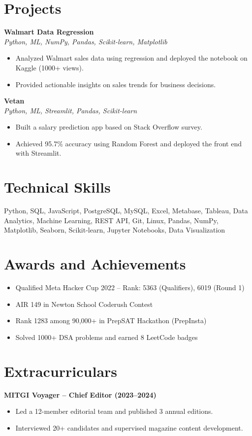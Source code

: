 \documentclass[a4paper,10pt]{article}
\begin{document}
\section*{Projects}

\textbf{Walmart Data Regression} \\
\textit{Python, ML, NumPy, Pandas, Scikit-learn, Matplotlib}
\begin{itemize}[itemsep=2pt, leftmargin=0pt]
    \item Analyzed Walmart sales data using regression and deployed the notebook on Kaggle (1000+ views).
    \item Provided actionable insights on sales trends for business decisions.
\end{itemize}

\textbf{Vetan} \\
\textit{Python, ML, Streamlit, Pandas, Scikit-learn}
\begin{itemize}[itemsep=2pt, leftmargin=0pt]
    \item Built a salary prediction app based on Stack Overflow survey.
    \item Achieved 95.7\% accuracy using Random Forest and deployed the front end with Streamlit.
\end{itemize}

\section*{Technical Skills}
Python, SQL, JavaScript, PostgreSQL, MySQL, Excel, Metabase, Tableau, Data Analytics, Machine Learning, REST API, Git, Linux, Pandas, NumPy, Matplotlib, Seaborn, Scikit-learn, Jupyter Notebooks, Data Visualization

\section*{Awards and Achievements}
\begin{itemize}[itemsep=2pt, leftmargin=0pt]
    \item Qualified Meta Hacker Cup 2022 – Rank: 5363 (Qualifiers), 6019 (Round 1)
    \item AIR 149 in Newton School Coderush Contest
    \item Rank 1283 among 90,000+ in PrepSAT Hackathon (PrepInsta)
    \item Solved 1000+ DSA problems and earned 8 LeetCode badges
\end{itemize}

\section*{Extracurriculars}
\textbf{MITGI Voyager – Chief Editor (2023–2024)}
\begin{itemize}[itemsep=2pt, leftmargin=0pt]
    \item Led a 12-member editorial team and published 3 annual editions.
    \item Interviewed 20+ candidates and supervised magazine content development.
\end{itemize}
\end{document}
